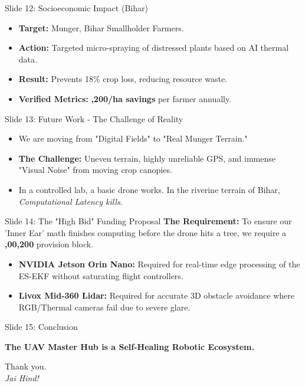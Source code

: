 \documentclass[aspectratio=169, xcolor=table]{beamer}
\begin{document}
\begin{frame}{Slide 12: Socioeconomic Impact (Bihar)}
    \begin{itemize}
        \item \textbf{Target:} Munger, Bihar Smallholder Farmers.
        \item \textbf{Action:} Targeted micro-spraying of distressed plants based on AI thermal data.
        \item \textbf{Result:} Prevents 18\% crop loss, reducing resource waste.
        \item \textbf{Verified Metrics:} \textbf{,200/ha savings} per farmer annually.
    \end{itemize}
\end{frame}

\begin{frame}{Slide 13: Future Work - The Challenge of Reality}
    \begin{itemize}
        \item We are moving from "Digital Fields" to "Real Munger Terrain."
        \item \textbf{The Challenge:} Uneven terrain, highly unreliable GPS, and immense "Visual Noise" from moving crop canopies.
        \item In a controlled lab, a basic drone works. In the riverine terrain of Bihar, \textit{Computational Latency kills}.
    \end{itemize}
\end{frame}

\begin{frame}{Slide 14: The "High Bid" Funding Proposal}
    \textbf{The Requirement:} To ensure our 'Inner Ear' math finishes computing before the drone hits a tree, we require a \textbf{,00,200} provision block.
    \begin{itemize}
        \item \textbf{NVIDIA Jetson Orin Nano:} Required for real-time edge processing of the ES-EKF without saturating flight controllers.
        \item \textbf{Livox Mid-360 Lidar:} Required for accurate 3D obstacle avoidance where RGB/Thermal cameras fail due to severe glare.
    \end{itemize}
\end{frame}

\begin{frame}{Slide 15: Conclusion}
    \begin{center}
        \Large{\textbf{The UAV Master Hub is a Self-Healing Robotic Ecosystem.}}
        
        \vspace{0.5cm}
        Thank you.\\
        \textit{Jai Hind!}
    \end{center}
\end{frame}
\end{document}
